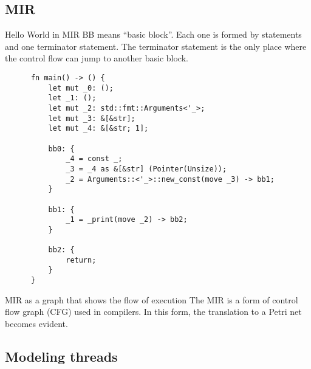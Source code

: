 \documentclass{beamer}
\begin{document}
\subsection{MIR}

\begin{frame}[fragile]{Hello World in MIR}
  \tiny
  BB means ``basic block''. Each one is formed by statements and one terminator statement.
  The terminator statement is the only place where the control flow can jump to another basic block.

  \begin{listing}
    \begin{verbatim}
      fn main() -> () {
          let mut _0: ();                     
          let _1: ();                         
          let mut _2: std::fmt::Arguments<'_>;
          let mut _3: &[&str];                
          let mut _4: &[&str; 1];             
      
          bb0: {
              _4 = const _;                    
              _3 = _4 as &[&str] (Pointer(Unsize));
              _2 = Arguments::<'_>::new_const(move _3) -> bb1;
          }
      
          bb1: {
              _1 = _print(move _2) -> bb2;
          }
      
          bb2: {
              return;
          }
      }      
    \end{verbatim}
  \end{listing}
\end{frame}

\begin{frame}{MIR as a graph that shows the flow of execution}
  \scriptsize
  The MIR is a form of control flow graph (CFG) used in compilers.
  In this form, the translation to a Petri net becomes evident.

  \begin{figure}[!htb]
    \centering
    
  \end{figure}
\end{frame}

\subsection{Modeling threads}
\end{document}
